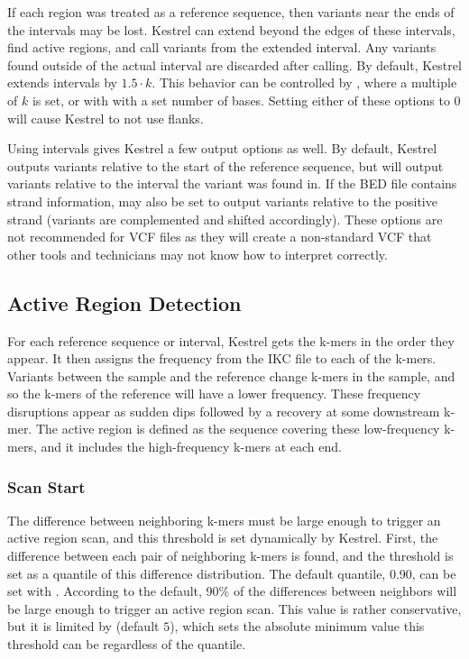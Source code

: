 If each region was treated as a reference sequence, then variants near the ends of the intervals may be lost. Kestrel can extend beyond the edges of these intervals, find active regions, and call variants from the extended interval. Any variants found outside of the actual interval are discarded after calling. By default, Kestrel extends intervals by $1.5 \cdot k$. This behavior can be controlled by , where a multiple of $k$ is set, or with  with a set number of bases. Setting either of these options to $0$ will cause Kestrel to not use flanks.

Using intervals gives Kestrel a few output options as well. By default, Kestrel outputs variants relative to the start of the reference sequence, but  will output variants relative to the interval the variant was found in. If the BED file contains strand information,  may also be set to output variants relative to the positive strand (variants are complemented and shifted accordingly). These options are not recommended for VCF files as they will create a non-standard VCF that other tools and technicians may not know how to interpret correctly.


\subsection{Active Region Detection}
\label{sec.process.ardetect}

For each reference sequence or interval, Kestrel gets the k-mers in the order they appear. It then assigns the frequency from the IKC file to each of the k-mers. Variants between the sample and the reference change k-mers in the sample, and so the k-mers of the reference will have a lower frequency. These frequency disruptions appear as sudden dips followed by a recovery at some downstream k-mer. The active region is defined as the sequence covering these low-frequency k-mers, and it includes the high-frequency k-mers at each end.

\subsubsection{Scan Start}
\label{sec.process.ardetect.start}

The difference between neighboring k-mers must be large enough to trigger an active region scan, and this threshold is set dynamically by Kestrel. First, the difference between each pair of neighboring k-mers is found, and the threshold is set as a quantile of this difference distribution. The default quantile, 0.90, can be set with . According to the default, 90\% of the differences between neighbors will be large enough to trigger an active region scan. This value is rather conservative, but it is limited by  (default $5$), which sets the absolute minimum value this threshold can be regardless of the quantile.

